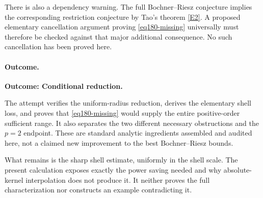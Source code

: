 \documentclass[11pt,a4paper]{article}
\newcommand{\eref}[2]{\hyperlink{extra:#1:#2}{[E#2]}}
\numberwithin{equation}{section}
\begin{document}
There is also a dependency warning. The full Bochner--Riesz conjecture
implies the corresponding restriction conjecture by Tao's theorem
\eref{30006774}{2}. A proposed elementary cancellation argument proving
\eqref{eq180-missing} universally must therefore be checked against that
major additional consequence. No such cancellation has been proved here.

\paragraph{Outcome.}
\textbf{Outcome: Conditional reduction.}

The attempt verifies the uniform-radius reduction, derives the elementary
shell loss, and proves that \eqref{eq180-missing} would supply the entire
positive-order sufficient range. It also separates the two different
necessary obstructions and the $p=2$ endpoint. These are standard analytic
ingredients assembled and audited here, not a claimed new improvement to
the best Bochner--Riesz bounds.

What remains is the sharp shell estimate, uniformly in the shell scale.
The present calculation exposes exactly the power saving needed and why
absolute-kernel interpolation does not produce it. It neither proves the
full characterization nor constructs an example contradicting it.
\end{document}
